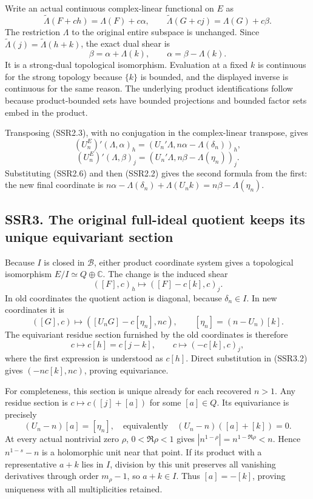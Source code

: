 Write an actual continuous complex-linear functional on \(E\) as \[
\widetilde\Lambda(F+ch)=\Lambda(F)+c\alpha,
\qquad
\widetilde\Lambda(G+cj)=\Lambda(G)+c\beta.
\tag{SSR2.5}
\] The restriction \(\Lambda\) to the original entire subspace is
unchanged. Since \(\widetilde\Lambda(j)=\widetilde\Lambda(h+k)\), the
exact dual shear is \[
\boxed{\beta=\alpha+\Lambda(k),\qquad\alpha=\beta-\Lambda(k).}
\tag{SSR2.6}
\] It is a strong-dual topological isomorphism. Evaluation at a fixed
\(k\) is continuous for the strong topology because \(\{k\}\) is
bounded, and the displayed inverse is continuous for the same reason.
The underlying product identifications follow because product-bounded
sets have bounded projections and bounded factor sets embed in the
product.

Transposing (SSR2.3), with no conjugation in the complex-linear
transpose, gives \[
(U_n^E)'(\Lambda,\alpha)_h
  =(U_n'\Lambda,n\alpha-\Lambda(\delta_n))_h,
\] \[
\boxed{(U_n^E)'(\Lambda,\beta)_j
  =(U_n'\Lambda,n\beta-\Lambda(\eta_n))_j.}
\tag{SSR2.7}
\] Substituting (SSR2.6) and then (SSR2.2) gives the second formula from
the first: the new final coordinate is
\(n\alpha-\Lambda(\delta_n)+\Lambda(U_nk)=n\beta-\Lambda(\eta_n)\).

\subsection{SSR3. The original full-ideal quotient keeps its unique
equivariant
section}\label{ssr3.-the-original-full-ideal-quotient-keeps-its-unique-equivariant-section}

Because \(I\) is closed in \(\mathcal B\), either product coordinate
system gives a topological isomorphism \(E/I\simeq Q\oplus\mathbb C\).
The change is the induced shear \[
([F],c)_h\longmapsto([F]-c[k],c)_j.
\tag{SSR3.1}
\] In old coordinates the quotient action is diagonal, because
\(\delta_n\in I\). In new coordinates it is \[
([G],c)\longmapsto([U_nG]-c[\eta_n],nc),
\qquad [\eta_n]=(n-U_n)[k].
\tag{SSR3.2}
\] The equivariant residue section furnished by the old coordinates is
therefore \[
c\longmapsto c[h]=c[j-k],
\qquad c\longmapsto(-c[k],c)_j,
\tag{SSR3.3}
\] where the first expression is understood as \(c[h]\). Direct
substitution in (SSR3.2) gives \((-nc[k],nc)\), proving equivariance.

For completeness, this section is unique already for each recovered
\(n>1\). Any residue section is \(c\mapsto c([j]+[a])\) for some
\([a]\in Q\). Its equivariance is precisely \[
(U_n-n)[a]=[\eta_n],
\quad\text{equivalently}\quad
(U_n-n)([a]+[k])=0.
\tag{SSR3.4}
\] At every actual nontrivial zero \(\rho\), \(0<\Re\rho<1\) gives
\(|n^{1-\rho}|=n^{1-\Re\rho}<n\). Hence \(n^{1-s}-n\) is a holomorphic
unit near that point. If its product with a representative \(a+k\) lies
in \(I\), division by this unit preserves all vanishing derivatives
through order \(m_\rho-1\), so \(a+k\in I\). Thus \([a]=-[k]\), proving
uniqueness with all multiplicities retained.


